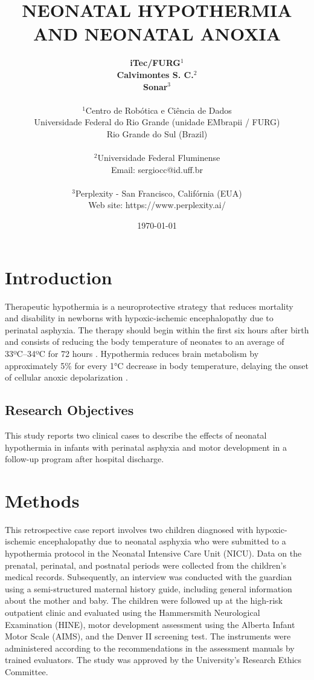 \documentclass[11pt,a4paper]{article}
\title{\textbf{NEONATAL HYPOTHERMIA AND NEONATAL ANOXIA}}
\author{
	\textbf{iTec/FURG}$^{1}$ \\
	\textbf{Calvimontes S. C.}$^{2}$ \\
	\textbf{Sonar}$^{3}$ \\
	\\
	\small $^{1}$Centro de Robótica e Ciência de Dados \\
	\small Universidade Federal do Rio Grande (unidade EMbrapii / FURG) \\
	\small Rio Grande do Sul (Brazil) \\
	\\
	\small $^{2}$Universidade Federal Fluminense \\
	\small Email: sergiocc@id.uff.br \\
	\\
	\small $^{3}$Perplexity - San Francisco, Califórnia (EUA) \\
	\small Web site: https://www.perplexity.ai/
}
\date{\today}
\begin{document}
	
	\maketitle
	
	\newpage
	
	\section{Introduction}
	Therapeutic hypothermia is a neuroprotective strategy that reduces mortality and disability in newborns with hypoxic-ischemic encephalopathy due to perinatal asphyxia. The therapy should begin within the first six hours after birth and consists of reducing the body temperature of neonates to an average of 33ºC–34ºC for 72 hours \cite{Azzopardi2014,Thayyil2021,Abate2021}. Hypothermia reduces brain metabolism by approximately 5\% for every 1°C decrease in body temperature, delaying the onset of cellular anoxic depolarization \cite{Silveira2015}.
		
	\subsection{Research Objectives}
	This study reports two clinical cases to describe the effects of neonatal hypothermia in infants with perinatal asphyxia and motor development in a follow-up program after hospital discharge.
	
	\section{Methods}
	This retrospective case report involves two children diagnosed with hypoxic-ischemic encephalopathy due to neonatal asphyxia who were submitted to a hypothermia protocol in the Neonatal Intensive Care Unit (NICU). Data on the prenatal, perinatal, and postnatal periods were collected from the children’s medical records. Subsequently, an interview was conducted with the guardian using a semi-structured maternal history guide, including general information about the mother and baby. The children were followed up at the high-risk outpatient clinic and evaluated using the Hammersmith Neurological Examination (HINE), motor development assessment using the Alberta Infant Motor Scale (AIMS), and the Denver II screening test. The instruments were administered according to the recommendations in the assessment manuals by trained evaluators. The study was approved by the University’s Research Ethics Committee.
	
\end{document}
